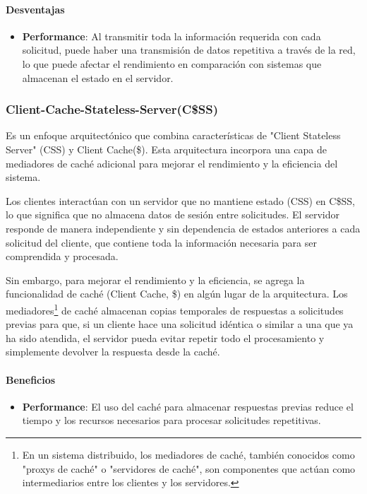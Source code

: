 \documentclass{article}
\begin{document}
		\paragraph{Desventajas}
		\begin{itemize}
			\item {\textbf{Performance}}: Al transmitir toda la información requerida con cada solicitud, puede haber una transmisión de datos repetitiva a través de la red, lo que puede afectar el rendimiento en comparación con sistemas que almacenan el estado en el servidor.
			
		\end{itemize}
		
		\subsubsection{Client-Cache-Stateless-Server(C\$SS)}
		Es un enfoque arquitectónico que combina características de "Client Stateless Server" (CSS) y Client Cache(\$). Esta arquitectura incorpora una capa de mediadores de caché adicional para mejorar el rendimiento y la eficiencia del sistema.
		
		Los clientes interactúan con un servidor que no mantiene estado (CSS) en C\$SS, lo que significa que no almacena datos de sesión entre solicitudes. El servidor responde de manera independiente y sin dependencia de estados anteriores a cada solicitud del cliente, que contiene toda la información necesaria para ser comprendida y procesada.
		
		Sin embargo, para mejorar el rendimiento y la eficiencia, se agrega la funcionalidad de caché (Client Cache, \$) en algún lugar de la arquitectura. Los mediadores\footnote{En un sistema distribuido, los mediadores de caché, también conocidos como "proxys de caché" o "servidores de caché", son componentes que actúan como intermediarios entre los clientes y los servidores.} de caché almacenan copias temporales de respuestas a solicitudes previas para que, si un cliente hace una solicitud idéntica o similar a una que ya ha sido atendida, el servidor pueda evitar repetir todo el procesamiento y simplemente devolver la respuesta desde la caché.
		
		\paragraph{Beneficios}
		\begin{itemize}	
			\item {\textbf{Performance}}: El uso del caché para almacenar respuestas previas reduce el tiempo y los recursos necesarios para procesar solicitudes repetitivas.
			
		\end{itemize}
		
\end{document}
